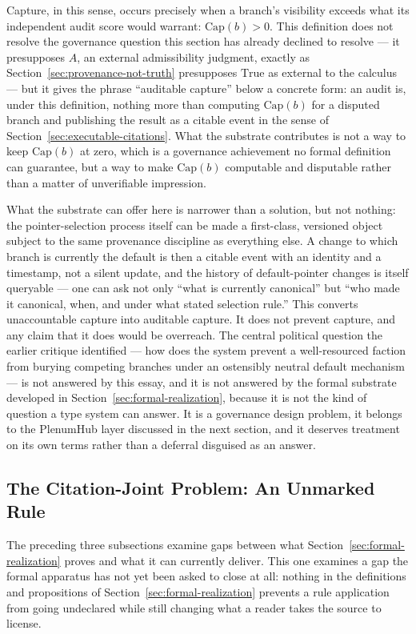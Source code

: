 \documentclass[11pt]{article}
\theoremstyle{definition}
\begin{document}
Capture, in this sense, occurs precisely when a branch's visibility exceeds what its independent audit score would warrant: $\mathrm{Cap}(b) > 0$. This definition does not resolve the governance question this section has already declined to resolve --- it presupposes $A$, an external admissibility judgment, exactly as Section~\ref{sec:provenance-not-truth} presupposes $\mathrm{True}$ as external to the calculus --- but it gives the phrase ``auditable capture'' below a concrete form: an audit is, under this definition, nothing more than computing $\mathrm{Cap}(b)$ for a disputed branch and publishing the result as a citable event in the sense of Section~\ref{sec:executable-citations}. What the substrate contributes is not a way to keep $\mathrm{Cap}(b)$ at zero, which is a governance achievement no formal definition can guarantee, but a way to make $\mathrm{Cap}(b)$ computable and disputable rather than a matter of unverifiable impression.

What the substrate can offer here is narrower than a solution, but not nothing: the pointer-selection process itself can be made a first-class, versioned object subject to the same provenance discipline as everything else. A change to which branch is currently the default is then a citable event with an identity and a timestamp, not a silent update, and the history of default-pointer changes is itself queryable --- one can ask not only ``what is currently canonical'' but ``who made it canonical, when, and under what stated selection rule.'' This converts unaccountable capture into auditable capture. It does not prevent capture, and any claim that it does would be overreach. The central political question the earlier critique identified --- how does the system prevent a well-resourced faction from burying competing branches under an ostensibly neutral default mechanism --- is not answered by this essay, and it is not answered by the formal substrate developed in Section~\ref{sec:formal-realization}, because it is not the kind of question a type system can answer. It is a governance design problem, it belongs to the PlenumHub layer discussed in the next section, and it deserves treatment on its own terms rather than a deferral disguised as an answer.

\subsection{The Citation-Joint Problem: An Unmarked Rule}
\label{sec:citation-joint}

The preceding three subsections examine gaps between what Section~\ref{sec:formal-realization} proves and what it can currently deliver. This one examines a gap the formal apparatus has not yet been asked to close at all: nothing in the definitions and propositions of Section~\ref{sec:formal-realization} prevents a rule application from going undeclared while still changing what a reader takes the source to license.
\end{document}

